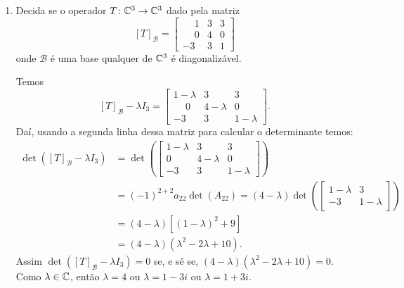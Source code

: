 \begin{exemplo}
\begin{enumerate}[label={\arabic*})]
        \item Decida se o operador $T \colon \mathbb{C}^3 \to \mathbb{C}^3$ dado pela matriz
            \[
                [T]_\mathcal{B} = \begin{bmatrix}\phantom{-}1 & 3 & 3\\\phantom{-}0 & 4 & 0\\-3 & 3 & 1\end{bmatrix}
            \]
            onde $\mathcal{B}$ é uma base qualquer de $\mathbb{C}^3$ é diagonalizável.
            \begin{solucao}
                Temos
                \[
                    [T]_\mathcal{B} - \lambda I_3 = \begin{bmatrix}1 - \lambda & 3 & 3\\\phantom{-}0 & 4 - \lambda & 0\\-3 & 3 & 1 -
                    \lambda\end{bmatrix}.
                \]
                Daí, usando a segunda linha dessa matriz para calcular o determinante temos:
                \begin{align*}
                    \det([T]_\mathcal{B} - \lambda I_3) &= \det\left(\begin{bmatrix}1 - \lambda & 3 & 3\\0 & 4 - \lambda & 0\\-3 & 3 & 1
                        - \lambda\end{bmatrix}\right) \\ &= (-1)^{2 + 2}a_22\det(A_{22}) = (4 - \lambda)\det\left(\begin{bmatrix}1 -
                \lambda & 3\\-3 & 1 - \lambda\end{bmatrix}\right) \\ &= (4 - \lambda)[(1 - \lambda)^2 + 9] \\ &= (4 - \lambda)(\lambda^2
                - 2\lambda + 10).
                \end{align*}
                Assim $\det([T]_\mathcal{B} - \lambda I_3) = 0$ se, e sé se, $(4 - \lambda)(\lambda^2 - 2\lambda + 10) = 0$. Como
                $\lambda \in \mathbb{C}$, então $\lambda = 4$ ou $\lambda = 1 - 3i$ ou $\lambda = 1 + 3i$.


\end{solucao}
\end{enumerate}
\end{exemplo}
